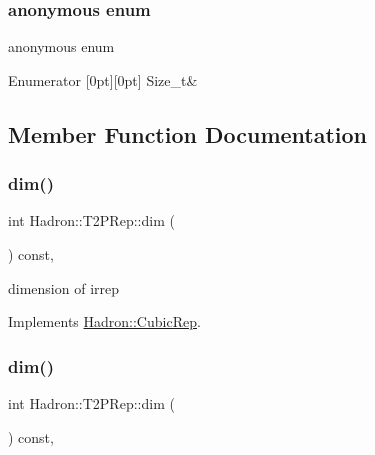 \subsubsection{\texorpdfstring{anonymous enum}{anonymous enum}}
{\footnotesize\ttfamily anonymous enum}

\begin{DoxyEnumFields}{Enumerator}
[0pt][0pt]{}\mbox{\label{structHadron_1_1T2PRep_ad2f205e101e724e1834369b667336f0cad73baac7e5ae922d59fe2eab63d434e5}} 
Size\+\_\+t&\\
\hline

\end{DoxyEnumFields}


\subsection{Member Function Documentation}
\mbox{\label{structHadron_1_1T2PRep_ad02168e1d6b3e149b6c49a0f5e0ee2bd}} 
\subsubsection{\texorpdfstring{dim()}{dim()}\hspace{0.1cm}{\footnotesize\ttfamily [1/2]}}
{\footnotesize\ttfamily int Hadron\+::\+T2\+P\+Rep\+::dim (\begin{DoxyParamCaption}{ }\end{DoxyParamCaption}) const\hspace{0.3cm}{\ttfamily [inline]}, {\ttfamily [virtual]}}

dimension of irrep 

Implements \mbox{\hyperlink{structHadron_1_1CubicRep_ac178d14064f037a66af4b9fb4b312d51}{Hadron\+::\+Cubic\+Rep}}.

\mbox{\label{structHadron_1_1T2PRep_ad02168e1d6b3e149b6c49a0f5e0ee2bd}} 
\subsubsection{\texorpdfstring{dim()}{dim()}\hspace{0.1cm}{\footnotesize\ttfamily [2/2]}}
{\footnotesize\ttfamily int Hadron\+::\+T2\+P\+Rep\+::dim (\begin{DoxyParamCaption}{ }\end{DoxyParamCaption}) const\hspace{0.3cm}{\ttfamily [inline]}, {\ttfamily [virtual]}}

